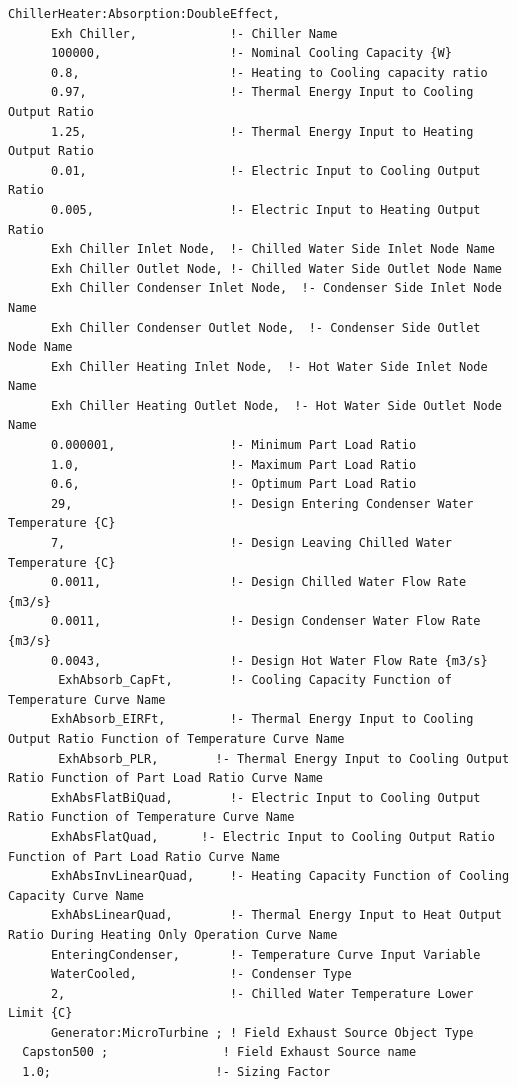 \begin{lstlisting}
ChillerHeater:Absorption:DoubleEffect,
      Exh Chiller,             !- Chiller Name
      100000,                  !- Nominal Cooling Capacity {W}
      0.8,                     !- Heating to Cooling capacity ratio
      0.97,                    !- Thermal Energy Input to Cooling Output Ratio
      1.25,                    !- Thermal Energy Input to Heating Output Ratio
      0.01,                    !- Electric Input to Cooling Output Ratio
      0.005,                   !- Electric Input to Heating Output Ratio
      Exh Chiller Inlet Node,  !- Chilled Water Side Inlet Node Name
      Exh Chiller Outlet Node, !- Chilled Water Side Outlet Node Name
      Exh Chiller Condenser Inlet Node,  !- Condenser Side Inlet Node Name
      Exh Chiller Condenser Outlet Node,  !- Condenser Side Outlet Node Name
      Exh Chiller Heating Inlet Node,  !- Hot Water Side Inlet Node Name
      Exh Chiller Heating Outlet Node,  !- Hot Water Side Outlet Node Name
      0.000001,                !- Minimum Part Load Ratio
      1.0,                     !- Maximum Part Load Ratio
      0.6,                     !- Optimum Part Load Ratio
      29,                      !- Design Entering Condenser Water Temperature {C}
      7,                       !- Design Leaving Chilled Water Temperature {C}
      0.0011,                  !- Design Chilled Water Flow Rate {m3/s}
      0.0011,                  !- Design Condenser Water Flow Rate {m3/s}
      0.0043,                  !- Design Hot Water Flow Rate {m3/s}
       ExhAbsorb_CapFt,        !- Cooling Capacity Function of Temperature Curve Name
      ExhAbsorb_EIRFt,         !- Thermal Energy Input to Cooling Output Ratio Function of Temperature Curve Name
       ExhAbsorb_PLR,        !- Thermal Energy Input to Cooling Output Ratio Function of Part Load Ratio Curve Name
      ExhAbsFlatBiQuad,        !- Electric Input to Cooling Output Ratio Function of Temperature Curve Name
      ExhAbsFlatQuad,      !- Electric Input to Cooling Output Ratio Function of Part Load Ratio Curve Name
      ExhAbsInvLinearQuad,     !- Heating Capacity Function of Cooling Capacity Curve Name
      ExhAbsLinearQuad,        !- Thermal Energy Input to Heat Output Ratio During Heating Only Operation Curve Name
      EnteringCondenser,       !- Temperature Curve Input Variable
      WaterCooled,             !- Condenser Type
      2,                       !- Chilled Water Temperature Lower Limit {C}
      Generator:MicroTurbine ; ! Field Exhaust Source Object Type
  Capston500 ;                ! Field Exhaust Source name
  1.0;                       !- Sizing Factor
\end{lstlisting}

